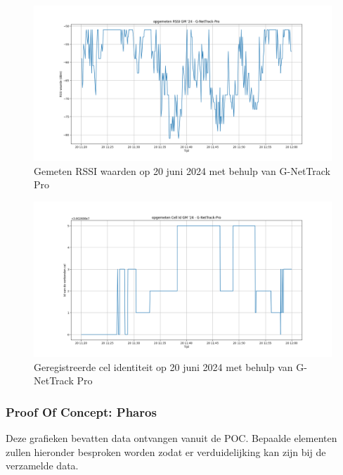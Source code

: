 \begin{figure}[!htb]
    \includegraphics[width=1.2\linewidth]{graphics/RSSI_graph_GNET}
    \caption[Gemeten RSSI waarden op 20 juni 2024 met behulp van G-NetTrack Pro]{Gemeten RSSI waarden op 20 juni 2024 met behulp van G-NetTrack Pro}
    \label{fig:RSSI_GNET}
\end{figure}

\begin{figure}[!htb]
    \includegraphics[width=1.2\linewidth]{graphics/CellId_graph_GNET}
    \caption[Geregistreerde cel identiteit op 20 juni 2024 met behulp van G-NetTrack Pro]{Geregistreerde cel identiteit op 20 juni 2024 met behulp van G-NetTrack Pro}
    \label{fig:CellId_GNET}
\end{figure}

\subsubsection{Proof Of Concept: Pharos}

Deze grafieken bevatten data ontvangen vanuit de POC. Bepaalde elementen zullen hieronder besproken worden zodat er verduidelijking kan zijn bij de verzamelde data. \\

